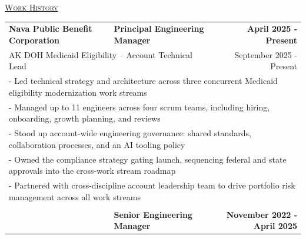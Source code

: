 \documentclass[letterpaper]{article}
\begin{document}
	\begin{center}
		\vspace{0.0in}
		\underline{\large \scshape Work History}
		\begin{tabular}{p{}p{}r}
			  \textbf{Nava Public Benefit Corporation} &
			  \quad   \textbf{Principal Engineering Manager} &
			  \textbf{April 2025 - Present\quad}
			  \\
			  \multicolumn{2}{p{0.5\textwidth}}{\quad AK DOH Medicaid Eligibility -- Account Technical Lead}
			  &
			  {September 2025 - Present \quad\quad\quad\quad}
		  \\
			  \multicolumn{3}{p{\textwidth}}{\quad\quad - Led technical strategy and architecture across three concurrent Medicaid eligibility modernization work streams} \\
			  \multicolumn{3}{p{\textwidth}}{\quad\quad - Managed up to 11 engineers across four scrum teams, including hiring, onboarding, growth planning, and reviews} \\
			  \multicolumn{3}{p{\textwidth}}{\quad\quad - Stood up account-wide engineering governance: shared standards, collaboration processes, and an AI tooling policy} \\
			  \multicolumn{3}{p{\textwidth}}{\quad\quad - Owned the compliance strategy gating launch, sequencing federal and state approvals into the cross-work stream roadmap} \\
			  \multicolumn{3}{p{\textwidth}}{\quad\quad - Partnered with cross-discipline account leadership team to drive portfolio risk management across all work streams} \\ 
		  \\
			  \textbf{} &
			  \quad\quad\quad \textbf{Senior Engineering Manager} &
			  \textbf{November 2022 - April 2025\quad}


\end{tabular}
\end{center}
\end{document}
